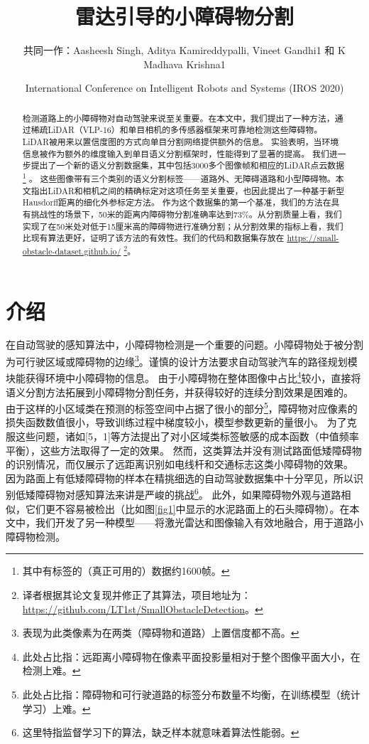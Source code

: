 \documentclass[lang=cn,11pt]{elegantpaper}
\title{雷达引导的小障碍物分割}
\author{共同一作：Aasheesh Singh, Aditya Kamireddypalli, Vineet Gandhi1 和 K Madhava Krishna1  }
\institute{国际信息技术学院, 海德拉巴, 印度}
\date{International Conference on Intelligent Robots and Systems (IROS 2020) }
\begin{document}
\maketitle

\begin{abstract}
\noindent 

检测道路上的小障碍物对自动驾驶来说至关重要。在本文中，我们提出了一种方法，通过稀疏LiDAR（VLP-16）和单目相机的多传感器框架来可靠地检测这些障碍物。LiDAR被用来以置信度图的方式向单目分割网络提供额外的信息。
实验表明，当环境信息被作为额外的维度输入到单目语义分割框架时，性能得到了显著的提高。
我们进一步提出了一个新的语义分割数据集，其中包括3000多个图像帧和相应的LiDAR点云数据\hl{}\footnote{其中有标签的（真正可用的）数据约1600帧。} 。
这些图像带有三个类别的语义分割标签——道路外、无障碍道路和小型障碍物。本文指出LiDAR和相机之间的精确标定对这项任务至关重要，也因此提出了一种基于新型Hausdorff距离的细化外参标定方法。
作为这个数据集的第一个基准，我们的方法在具有挑战性的场景下，50米的距离内障碍物分割准确率达到73\%。从分割质量上看，我们实现了在50米处对低于15厘米高的障碍物进行准确分割；从分割效果的指标上看，我们比现有算法更好，证明了该方法的有效性。我们的代码和数据集存放在 \href{https://small-obstacle-dataset.github.io/}{https://small-obstacle-dataset.github.io/}
\footnote{译者根据其论文复现并修正了其算法，项目地址为：\href{https://github.com/LT1st/SmallObstacleDetection}{https://github.com/LT1st/SmallObstacleDetection}。}。

\end{abstract}


\section{介绍}
在自动驾驶的感知算法中，小障碍物检测是一个重要的问题。小障碍物处于被分割为可行驶区域或障碍物的边缘\footnote{表现为此类像素为在两类（障碍物和道路）上置信度都不高。}。谨慎的设计方法要求自动驾驶汽车的路径规划模块能获得环境中小障碍物的信息。
由于小障碍物在整体图像中占比\footnote{此处占比指：远距离小障碍物在像素平面投影量相对于整个图像平面大小，在检测上难。}较小，直接将语义分割方法拓展到小障碍物分割任务，并获得较好的连续分割效果是困难的。
由于这样的小区域类在预测的标签空间中占据了很小的部分\footnote{此处占比指：障碍物和可行驶道路的标签分布数量不均衡，在训练模型（统计学习）上难。}，障碍物对应像素的损失函数数值很小，导致训练过程中梯度较小，模型参数更新的量很小。
为了克服这些问题，诸如[5，1]等方法提出了对小区域类标签敏感的成本函数（中值频率平衡），这些方法取得了一定的效果。
然而，这类算法并没有测试路面低矮障碍物的识别情况，而仅展示了远距离识别如电线杆和交通标志这类小障碍物的效果。
因为路面上有低矮障碍物的样本在精挑细选的自动驾驶数据集中十分罕见，所以识别低矮障碍物对感知算法来讲是严峻的挑战\footnote{这里特指监督学习下的算法，缺乏样本就意味着算法性能弱。}。
此外，如果障碍物外观与道路相似，它们更不容易被检出（比如图\ref{fig1}中显示的水泥路面上的石头障碍物）。在本文中，我们开发了另一种模型——将激光雷达和图像输入有效地融合，用于道路小障碍物检测。
\end{document}
